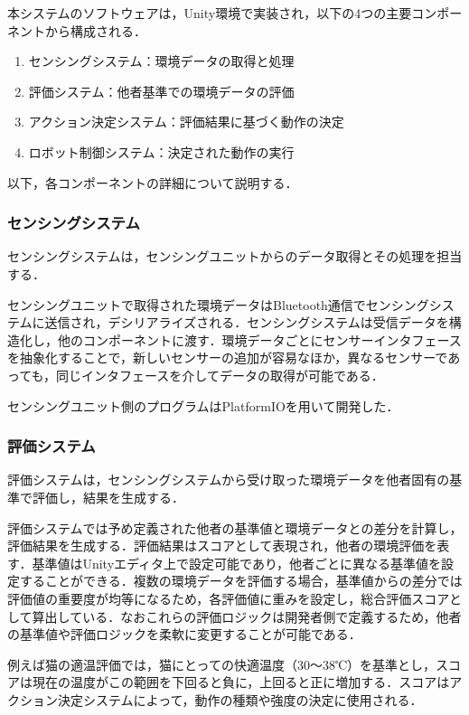 \documentclass{cuxarticle}
\begin{document}
本システムのソフトウェアは，Unity環境で実装され，以下の4つの主要コンポーネントから構成される．

\begin{enumerate}
  \item センシングシステム：環境データの取得と処理
  \item 評価システム：他者基準での環境データの評価
  \item アクション決定システム：評価結果に基づく動作の決定
  \item ロボット制御システム：決定された動作の実行
\end{enumerate}

以下，各コンポーネントの詳細について説明する．

\subsubsection{センシングシステム}
センシングシステムは，センシングユニットからのデータ取得とその処理を担当する．

センシングユニットで取得された環境データはBluetooth通信でセンシングシステムに送信され，デシリアライズされる．センシングシステムは受信データを構造化し，他のコンポーネントに渡す．環境データごとにセンサーインタフェースを抽象化することで，新しいセンサーの追加が容易なほか，異なるセンサーであっても，同じインタフェースを介してデータの取得が可能である．

センシングユニット側のプログラムはPlatformIOを用いて開発した．

\subsubsection{評価システム}
評価システムは，センシングシステムから受け取った環境データを他者固有の基準で評価し，結果を生成する．

評価システムでは予め定義された他者の基準値と環境データとの差分を計算し，評価結果を生成する．評価結果はスコアとして表現され，他者の環境評価を表す．基準値はUnityエディタ上で設定可能であり，他者ごとに異なる基準値を設定することができる．複数の環境データを評価する場合，基準値からの差分では評価値の重要度が均等になるため，各評価値に重みを設定し，総合評価スコアとして算出している．なおこれらの評価ロジックは開発者側で定義するため，他者の基準値や評価ロジックを柔軟に変更することが可能である．

例えば猫の適温評価では，猫にとっての快適温度（30～38℃）を基準とし，スコアは現在の温度がこの範囲を下回ると負に，上回ると正に増加する．スコアはアクション決定システムによって，動作の種類や強度の決定に使用される．
\end{document}
